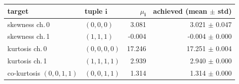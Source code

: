 \begin{tabular}{l l r r}
target & tuple $\mathbf{i}$ & $\mu_\mathbf{i}$ & achieved (mean $\pm$ std) \\
\hline
skewness ch.\,0 & $(0,0,0)$ & 3.081 & 3.021 $\pm$ 0.047 \\
skewness ch.\,1 & $(1,1,1)$ & -0.004 & -0.004 $\pm$ 0.000 \\
kurtosis ch.\,0 & $(0,0,0,0)$ & 17.246 & 17.251 $\pm$ 0.004 \\
kurtosis ch.\,1 & $(1,1,1,1)$ & 2.939 & 2.940 $\pm$ 0.000 \\
co-kurtosis $(0,0,1,1)$ & $(0,0,1,1)$ & 1.314 & 1.314 $\pm$ 0.000 \\
\end{tabular}
